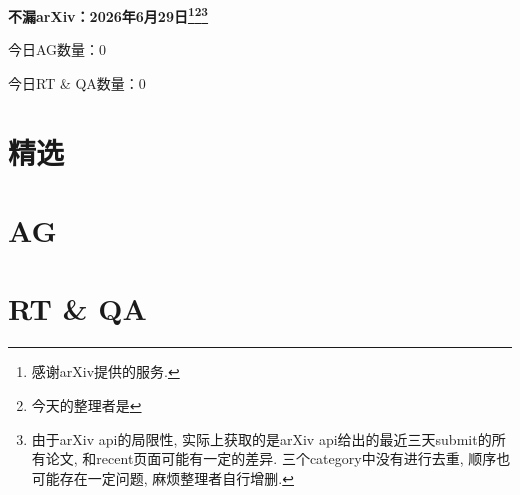 \documentclass[9pt, a4paper]{article}
\theoremstyle{plain}
\theoremstyle{definition}
\theoremstyle{remark}
\newcommand{\AGnumber}{0}
\newcommand{\RTQAnumber}{0}
\newcommand{\NewestDate}{2026年6月29日}
\newcommand{\todayarXiver}{} %
\begin{document}
\begin{center}
    \Huge\textbf{不漏arXiv：\NewestDate\footnote{感谢arXiv提供的服务.}\footnote{今天的整理者是\todayarXiver}\footnote{由于arXiv api的局限性, 实际上获取的是arXiv api给出的最近三天submit的所有论文, 和recent页面可能有一定的差异. 三个category中没有进行去重, 顺序也可能存在一定问题, 麻烦整理者自行增删.}} \\
\end{center}

\setcounter{section}{-1}

\begin{center}
    今日AG数量：\AGnumber
    
    今日RT \& QA数量：\RTQAnumber
    
\end{center}


\section{精选}


\section{AG}

\section{RT \& QA}
\end{document}
